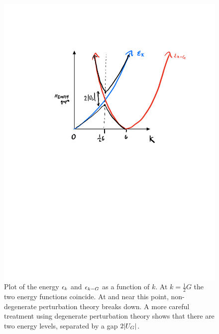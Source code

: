 \begin{figure}[htbp]
    \centering
    \includegraphics[scale=0.7]{Images/fig-energyvskgap.pdf}
    
    \caption{Plot of the energy $\epsilon_k$ and $\epsilon_{k-G}$ as a function of $k$. At $k = \frac{1}{2}G$ the two energy functions coincide. At and near this point, non-degenerate perturbation theory breaks down. A more careful treatment using degenerate perturbation theory shows that there are two energy levels, separated by a gap $2\lvert U_G \rvert$.}
    \label{fig-energyvskgap}
\end{figure}